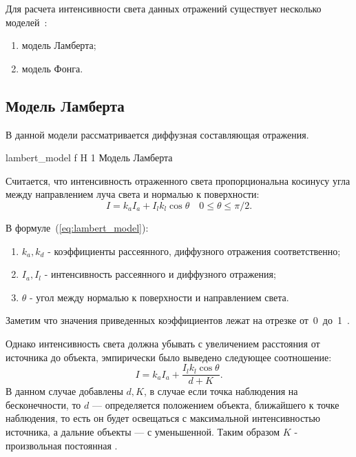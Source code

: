 Для расчета интенсивности света данных отражений существует несколько моделей~\cite{Rodgers}:
\begin{enumerate}
	\item модель Ламберта;
	\item модель Фонга.
\end{enumerate}

\subsection{Модель Ламберта}
В данной модели рассматривается диффузная составляющая отражения.


{lambert_model} %
{f} %
{H} %
{1\textwidth} %
{Модель Ламберта} %



Считается, что интенсивность отраженного света
пропорциональна косинусу угла между направлением луча света и нормалью к поверхности:
\begin{equation} 
	I = k_aI_a + I_lk_l\cos\theta \quad 0 \leq \theta \leq \pi/2.
	\label{eq:lambert_model}
\end{equation}

В  формуле~(\ref{eq:lambert_model}):
\begin{enumerate}
	\item $k_a,k_d$ - коэффициенты рассеянного, диффузного отражения соответственно;
	\item $I_a,I_l$ - интенсивность рассеянного и диффузного отражения;
	\item $\theta$ - угол между нормалью к поверхности и направлением света.
\end{enumerate}
Заметим что значения приведенных коэффициентов лежат на отрезке от~0~до~1~\cite{Rodgers}.

Однако интенсивность света должна убывать с увеличением расстояния от источника до объекта, эмпирически было выведено следующее соотношение:
\begin{equation} 
	I = k_aI_a + \frac{I_lk_l\cos\theta}{d + K}.
	\label{eq:lambert_model_space}
\end{equation}
В данном случае добавлены $d,K$, в случае если точка наблюдения на бесконечности, то $d$ --- определяется положением объекта,
ближайшего к точке наблюдения, то есть он будет освещаться с максимальной интенсивностью источника, а дальние объекты --- с уменьшенной.
Таким образом $K$ - произвольная постоянная \cite{Rodgers}.


